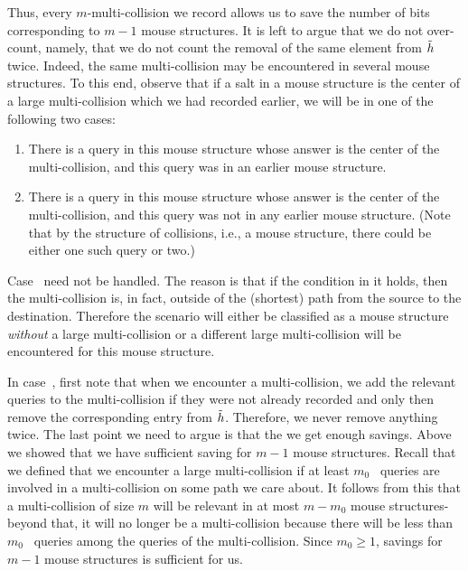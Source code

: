 Thus, every $m$-multi-collision we record allows us to save the number of bits corresponding to $m-1$ mouse structures. It is left to argue that we do not over-count, namely, that we do not count the removal of the same element from $\tilde{h}$ twice. Indeed, the same multi-collision may be encountered in several mouse structures. To this end, observe that if a salt in a mouse structure is the center of a large multi-collision which we had recorded earlier, we will be in one of the following two cases:
\begin{enumerate}
  \item \label{firstcase}There is a query in this mouse structure whose answer is the center of the multi-collision, and this query was in an earlier mouse structure.
  \item \label{secondcase}There is a query in this mouse structure whose answer is the center of the multi-collision, and this query was not in any earlier mouse structure. (Note that by the structure of collisions, i.e., a mouse structure, there could be either one such query or two.)
\end{enumerate}
Case~ need not be handled. The reason is that if the condition in it holds, then the multi-collision is, in fact, outside of the (shortest) path from the source to the destination. Therefore the scenario will either be classified as a mouse structure \emph{without} a large multi-collision or a different large multi-collision will be encountered for this mouse structure.

In case~, first note that when we encounter a multi-collision, we add the relevant queries to the multi-collision if they were not already recorded and only then remove the corresponding entry from $\tilde{h}$. Therefore, we never remove anything twice. The last point we need to argue is that the we get enough savings.
Above we showed that we have sufficient saving for $m-1$ mouse structures. Recall that we defined that we encounter a large multi-collision if at least $m_0$ \urep\ queries are involved in a multi-collision on some path we care about. It follows from this that a multi-collision of size $m$ will be relevant in at most $m-m_0$ mouse structures- beyond that, it will no longer be a multi-collision because there will be less than $m_0$ \urep\ queries among the queries of the multi-collision. Since $m_0\geq 1$, savings for $m-1$ mouse structures is sufficient for us.

